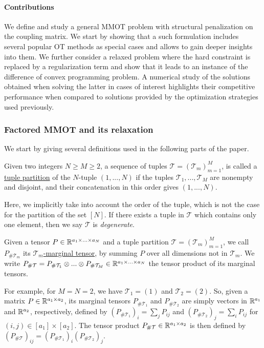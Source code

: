 \paragraph{Contributions} We define and study a general MMOT problem with structural penalization on the coupling matrix.
We start by showing that a such formulation includes several popular OT methods as special cases and allows to gain deeper insights
into them. We further consider a relaxed problem where the hard constraint is replaced by a regularization term and show that it leads
to an instance of the difference of convex programming problem. A numerical study of the solutions obtained when solving the latter
in cases of interest highlights their competitive performance when compared to solutions provided by the optimization
strategies used previously.

\subsubsection*{Factored MMOT and its relaxation}
We start by giving several definitions used in the following parts of the paper.
\begin{definition}
 Given two integers $N \geq M \geq 2$, a sequence of tuples $\mathcal T = (\mathcal T_m)_{m=1}^M$, is called a
 \underline{tuple partition} of the $N$-tuple $(1,...,N)$ if the tuples $\mathcal T_1, ..., \mathcal T_M$ are nonempty and disjoint,
 and their concatenation in this order gives $(1,...,N)$.
\end{definition}
Here, we implicitly take into account the order of the tuple, which is not the case for the partition of the set $[N]$. If
there exists a tuple in $\mathcal T$ which contains only one element, then we say $\mathcal T$ is \textit{degenerate}.

\begin{definition}
  Given a tensor $P \in \mathbb R^{a_1 \times ... \times a_N}$ and a tuple partition $\mathcal T = (\mathcal T_m)_{m=1}^M$,
  we call $P_{\# \mathcal T_m}$ its \underline{$\mathcal T_m$-marginal tensor}, by summing $P$ over all dimensions not in $\mathcal T_m$.
  We write $P_{\# \mathcal T} = P_{\# \mathcal T_1} \otimes ... \otimes P_{\# \mathcal T_M} \in \mathbb R^{a_1 \times ... \times a_N}$
  the tensor product of its marginal tensors.
\end{definition}
For example, for $M=N=2$, we have $\mathcal T_1 = (1)$ and $\mathcal T_2 = (2)$. So, given a matrix
$P \in \mathbb R^{a_1 \times a_2}$, its marginal tensors $P_{\# \mathcal T_1}$ and $P_{\# \mathcal T_2}$ are simply vectors in
$\mathbb R^{a_1}$ and $\mathbb R^{a_2}$, respectively, defined by $(P_{\# \mathcal T_1})_i = \sum_j P_{ij}$ and
$(P_{\# \mathcal T_2})_j = \sum_i P_{ij}$ for $(i,j) \in [a_1] \times [a_2]$. The tensor product
$P_{\# \mathcal T} \in \mathbb R^{a_1 \times a_2}$ is then defined by
$(P_{\#\mathcal T})_{ij} = (P_{\# \mathcal T_1})_i (P_{\# \mathcal T_2})_j$.

